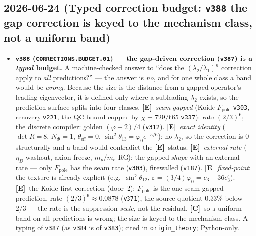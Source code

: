 \documentclass[11pt]{article}
\providecommand{\mE}{\textbf{[E]}}\providecommand{\mC}{\textbf{[C]}}
\providecommand{\vref}[1]{\texttt{#1}}
\begin{document}
\subsection*{2026-06-24 (Typed correction budget: \texttt{v388} the gap correction is keyed to the mechanism class, not a uniform band)}
\begin{itemize}
\item \textbf{\texttt{v388} (\texttt{CORRECTIONS.BUDGET.01}) --- the gap-driven correction (\vref{v387}) is a \emph{typed} budget.}
A machine-checked answer to ``does the $(\lambda_2/\lambda_1)^n$ correction apply to \emph{all} predictions?'' --- the
answer is \emph{no}, and for one whole class a band would be \emph{wrong}. Because the size is the distance from a
gapped operator's leading eigenvector, it is defined only where a subleading $\lambda_2$ exists, so the prediction
surface splits into four classes. \mE\ \emph{seam-gapped} (Koide $F_{\mathrm{pole}}$ \vref{v303}, recovery \vref{v221},
the QG bound capped by $\chi=729/665$ \vref{v337}): rate $(2/3)^6$; the discrete compiler: golden $(\varphi+2)/4$
(\vref{v312}). \mE\ \emph{exact identity} ($\det R=8$, $N_\Phi=1$, $\theta_{\mathrm{eff}}=0$, $\sin^2\theta_{13}=\varphi_0
e^{-5/6}$): no $\lambda_2$, so the correction is $0$ structurally and a band would contradict the \mE\ status. \mE\
\emph{external-rate} ($\eta_B$ washout, axion freeze, $m_p/m_e$ RG): the gapped \emph{shape} with an external rate ---
only $F_{\mathrm{pole}}$ has the seam rate (\vref{v303}), firewalled (\vref{v187}). \mE\ \emph{fixed-point}: the texture
is already explicit (e.g.\ $\sin^2\theta_{12}$, $\varepsilon=(3/4)\varphi_0=c_3+36c_3^4$). \mE\ the Koide first correction
(door~2): $F_{\mathrm{pole}}$ is the one seam-gapped prediction, rate $(2/3)^6\approx0.0878$ (\vref{v371}), the source
quotient $0.33\%$ below $2/3$ --- the rate is the suppression \emph{scale}, not the residual. \mC\ so a uniform band on
all predictions is wrong; the size is keyed to the mechanism class. A typing of \vref{v387} (as \vref{v384} is of
\vref{v383}); cited in \texttt{origin\_theory}; Python-only.
\end{itemize}
\end{document}
